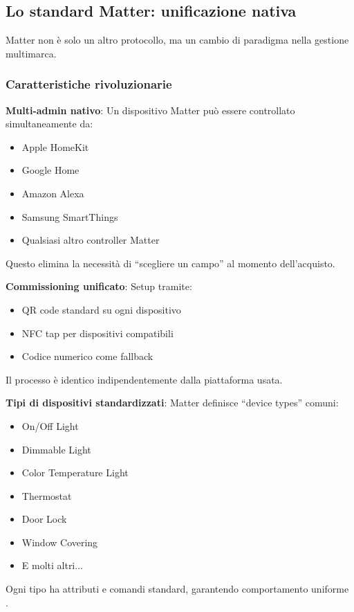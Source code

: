 \subsection{Lo standard Matter: unificazione nativa}

Matter non è solo un altro protocollo, ma un cambio di paradigma nella gestione multimarca.

\subsubsection{Caratteristiche rivoluzionarie}

\textbf{Multi-admin nativo}: Un dispositivo Matter può essere controllato simultaneamente da:
\begin{itemize}
    \item Apple HomeKit
    \item Google Home
    \item Amazon Alexa
    \item Samsung SmartThings
    \item Qualsiasi altro controller Matter
\end{itemize}

Questo elimina la necessità di ``scegliere un campo'' al momento dell'acquisto.

\textbf{Commissioning unificato}: Setup tramite:
\begin{itemize}
    \item QR code standard su ogni dispositivo
    \item NFC tap per dispositivi compatibili
    \item Codice numerico come fallback
\end{itemize}

Il processo è identico indipendentemente dalla piattaforma usata.

\textbf{Tipi di dispositivi standardizzati}: Matter definisce ``device types'' comuni:
\begin{itemize}
    \item On/Off Light
    \item Dimmable Light
    \item Color Temperature Light
    \item Thermostat
    \item Door Lock
    \item Window Covering
    \item E molti altri...
\end{itemize}

Ogni tipo ha attributi e comandi standard, garantendo comportamento uniforme \cite{ConnectivityStandardsAlliance2023}.

